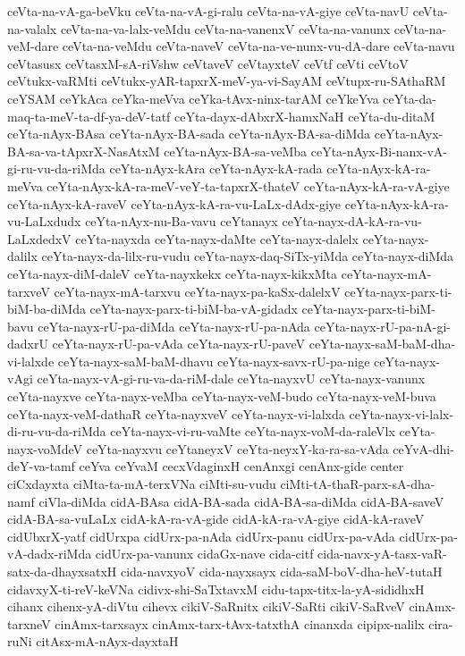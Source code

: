 {ceVta-na-vA-ga-beVku
ceVta-na-vA-gi-ralu
ceVta-na-vA-giye
ceVta-navU
ceVta-na-valalx
ceVta-na-va-lalx-veMdu
ceVta-na-vanenxV
ceVta-na-vanunx
ceVta-na-veM-dare
ceVta-na-veMdu
ceVta-naveV
ceVta-na-ve-nunx-vu-dA-dare
ceVta-navu
ceVtasusx
ceVtasxM-sA-riVshw
ceVtaveV
ceVtayxteV
ceVtf
ceVti
ceVtoV
ceVtukx-vaRMti
ceVtukx-yAR-tapxrX-meV-ya-vi-SayAM
ceVtupx-ru-SAthaRM
ceYSAM
ceYkAca
ceYka-meVva
ceYka-tAvx-ninx-tarAM
ceYkeYva
ceYta-da-maq-ta-meV-ta-df-ya-deV-tatf
ceYta-dayx-dAbxrX-hamxNaH
ceYta-du-ditaM
ceYta-nAyx-BAsa
ceYta-nAyx-BA-sada
ceYta-nAyx-BA-sa-diMda
ceYta-nAyx-BA-sa-va-tApxrX-NasAtxM
ceYta-nAyx-BA-sa-veMba
ceYta-nAyx-Bi-nanx-vA-gi-ru-vu-da-riMda
ceYta-nAyx-kAra
ceYta-nAyx-kA-rada
ceYta-nAyx-kA-ra-meVva
ceYta-nAyx-kA-ra-meV-veY-ta-tapxrX-thateV
ceYta-nAyx-kA-ra-vA-giye
ceYta-nAyx-kA-raveV
ceYta-nAyx-kA-ra-vu-LaLx-dAdx-giye
ceYta-nAyx-kA-ra-vu-LaLxdudx
ceYta-nAyx-nu-Ba-vavu
ceYtanayx
ceYta-nayx-dA-kA-ra-vu-LaLxdedxV
ceYta-nayxda
ceYta-nayx-daMte
ceYta-nayx-dalelx
ceYta-nayx-dalilx
ceYta-nayx-da-lilx-ru-vudu
ceYta-nayx-daq-SiTx-yiMda
ceYta-nayx-diMda
ceYta-nayx-diM-daleV
ceYta-nayxkekx
ceYta-nayx-kikxMta
ceYta-nayx-mA-tarxveV
ceYta-nayx-mA-tarxvu
ceYta-nayx-pa-kaSx-dalelxV
ceYta-nayx-parx-ti-biM-ba-diMda
ceYta-nayx-parx-ti-biM-ba-vA-gidadx
ceYta-nayx-parx-ti-biM-bavu
ceYta-nayx-rU-pa-diMda
ceYta-nayx-rU-pa-nAda
ceYta-nayx-rU-pa-nA-gi-dadxrU
ceYta-nayx-rU-pa-vAda
ceYta-nayx-rU-paveV
ceYta-nayx-saM-baM-dha-vi-lalxde
ceYta-nayx-saM-baM-dhavu
ceYta-nayx-savx-rU-pa-nige
ceYta-nayx-vAgi
ceYta-nayx-vA-gi-ru-va-da-riM-dale
ceYta-nayxvU
ceYta-nayx-vanunx
ceYta-nayxve
ceYta-nayx-veMba
ceYta-nayx-veM-budo
ceYta-nayx-veM-buva
ceYta-nayx-veM-dathaR
ceYta-nayxveV
ceYta-nayx-vi-lalxda
ceYta-nayx-vi-lalx-di-ru-vu-da-riMda
ceYta-nayx-vi-ru-vaMte
ceYta-nayx-voM-da-raleVlx
ceYta-nayx-voMdeV
ceYta-nayxvu
ceYtaneyxV
ceYta-neyxY-ka-ra-sa-vAda
ceYvA-dhi-deY-va-tamf
ceYva
ceYvaM
cecxVdaginxH
cenAnxgi
cenAnx-gide
center
ciCxdayxta
ciMta-ta-mA-terxVNa
ciMti-su-vudu
ciMti-tA-thaR-parx-sA-dha-namf
ciVla-diMda
cidA-BAsa
cidA-BA-sada
cidA-BA-sa-diMda
cidA-BA-saveV
cidA-BA-sa-vuLaLx
cidA-kA-ra-vA-gide
cidA-kA-ra-vA-giye
cidA-kA-raveV
cidUbxrX-yatf
cidUrxpa
cidUrx-pa-nAda
cidUrx-panu
cidUrx-pa-vAda
cidUrx-pa-vA-dadx-riMda
cidUrx-pa-vanunx
cidaGx-nave
cida-citf
cida-navx-yA-tasx-vaR-satx-da-dhayxsatxH
cida-navxyoV
cida-nayxsayx
cida-saM-boV-dha-heV-tutaH
cidavxyX-ti-reV-keVNa
cidivx-shi-SaTxtavxM
cidu-tapx-titx-la-yA-sididhxH
cihanx
cihenx-yA-diVtu
cihevx
cikiV-SaRnitx
cikiV-SaRti
cikiV-SaRveV
cinAmx-tarxneV
cinAmx-tarxsayx
cinAmx-tarx-tAvx-tatxthA
cinanxda
cipipx-nalilx
cira-ruNi
citAsx-mA-nAyx-dayxtaH
}
